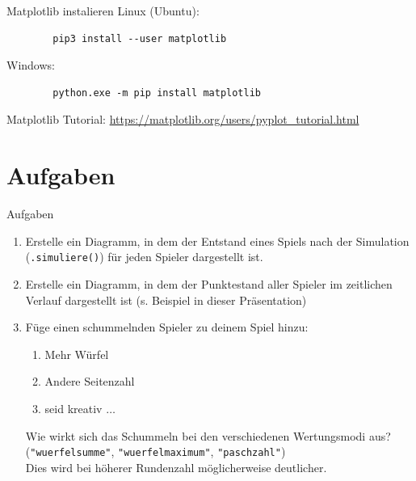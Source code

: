 \begin{frame}[fragile]{Matplotlib instalieren}
    Linux (Ubuntu):
    \begin{lstlisting}
        pip3 install --user matplotlib
    \end{lstlisting}

    Windows:
    \begin{lstlisting}
        python.exe -m pip install matplotlib
    \end{lstlisting}
    Matplotlib Tutorial: \url{https://matplotlib.org/users/pyplot_tutorial.html}
\end{frame}

\section{Aufgaben}

\begin{frame}{Aufgaben}
    \begin{enumerate}
        \item Erstelle ein Diagramm, in dem der Entstand eines Spiels nach der Simulation (\texttt{.simuliere()}) für jeden Spieler dargestellt ist.
        \item Erstelle ein Diagramm, in dem der Punktestand aller Spieler im zeitlichen Verlauf dargestellt ist (s. Beispiel in dieser Präsentation)
        \item Füge einen schummelnden Spieler zu deinem Spiel hinzu:
            \begin{enumerate}
                \item Mehr Würfel
                \item Andere Seitenzahl
                \item seid kreativ $\dots$
            \end{enumerate}
            Wie wirkt sich das Schummeln bei den verschiedenen Wertungsmodi aus? \\
            (\texttt{"wuerfelsumme"}, \texttt{"wuerfelmaximum"}, \texttt{"paschzahl"})\\
            Dies wird bei höherer Rundenzahl möglicherweise deutlicher.
    \end{enumerate}
\end{frame}




